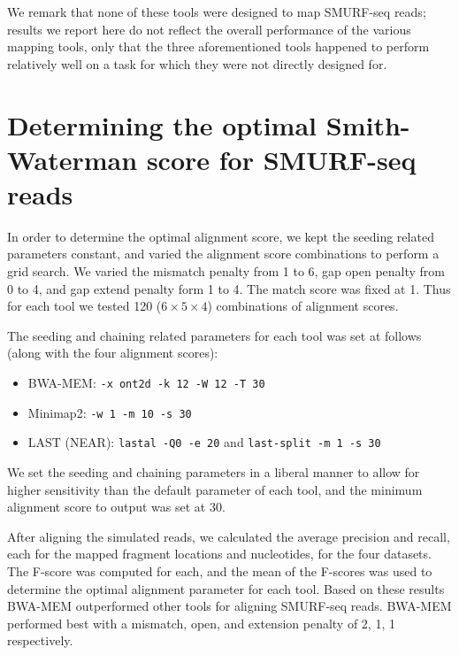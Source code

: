 We remark that none of these tools were designed to map SMURF-seq reads;
results we report here do not reflect the overall performance of the
various mapping tools, only that the three aforementioned tools happened
to perform relatively well on a task for which they were not directly
designed for.


\section*{Determining the optimal Smith-Waterman score for
  SMURF-seq reads}
In order to determine the optimal alignment score, we kept the seeding
related parameters constant, and varied the alignment score combinations
to perform a grid search. We varied the mismatch penalty from 1 to 6,
gap open penalty from 0 to 4, and gap extend penalty form 1 to 4.  The
match score was fixed at 1. Thus for each tool we tested 120 ($6 \times
5 \times 4$) combinations of alignment scores.

The seeding and chaining related parameters for each tool was set at
follows (along with the four alignment scores):
\begin{itemize}
\item BWA-MEM: \texttt{-x ont2d -k 12 -W 12 -T 30}
\item Minimap2: \texttt{-w 1 -m 10 -s 30}
\item LAST (NEAR): \texttt{lastal -Q0 -e 20} and \texttt{last-split -m 1 -s 30}
\end{itemize}
We set the seeding and chaining parameters in a liberal manner to allow
for higher sensitivity than the default parameter of each tool, and
the minimum alignment score to output was set at 30.

After aligning the simulated reads, we calculated the average precision
and recall, each for the mapped fragment locations and nucleotides, for
the four datasets. The F-score was computed for each, and the mean of
the F-scores was used to determine the optimal alignment parameter for
each tool. Based on these results BWA-MEM outperformed other tools for
aligning SMURF-seq reads. BWA-MEM performed best with a mismatch, open,
and extension penalty of 2, 1, 1 respectively.

